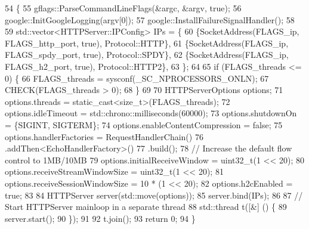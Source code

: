 \begin{DoxyCode}
54                                  \{
55   gflags::ParseCommandLineFlags(&argc, &argv, \textcolor{keyword}{true});
56   google::InitGoogleLogging(argv[0]);
57   google::InstallFailureSignalHandler();
58 
59   std::vector<HTTPServer::IPConfig> IPs = \{
60     \{SocketAddress(FLAGS\_ip, FLAGS\_http\_port, \textcolor{keyword}{true}), Protocol::HTTP\},
61     \{SocketAddress(FLAGS\_ip, FLAGS\_spdy\_port, \textcolor{keyword}{true}), Protocol::SPDY\},
62     \{SocketAddress(FLAGS\_ip, FLAGS\_h2\_port, \textcolor{keyword}{true}), Protocol::HTTP2\},
63   \};
64 
65   \textcolor{keywordflow}{if} (FLAGS\_threads <= 0) \{
66     FLAGS\_threads = sysconf(\_SC\_NPROCESSORS\_ONLN);
67     CHECK(FLAGS\_threads > 0);
68   \}
69 
70   HTTPServerOptions options;
71   options.threads = \textcolor{keyword}{static\_cast<}\textcolor{keywordtype}{size\_t}\textcolor{keyword}{>}(FLAGS\_threads);
72   options.idleTimeout = std::chrono::milliseconds(60000);
73   options.shutdownOn = \{SIGINT, SIGTERM\};
74   options.enableContentCompression = \textcolor{keyword}{false};
75   options.handlerFactories = RequestHandlerChain()
76       .addThen<EchoHandlerFactory>()
77       .build();
78   \textcolor{comment}{// Increase the default flow control to 1MB/10MB}
79   options.initialReceiveWindow = uint32\_t(1 << 20);
80   options.receiveStreamWindowSize = uint32\_t(1 << 20);
81   options.receiveSessionWindowSize = 10 * (1 << 20);
82   options.h2cEnabled = \textcolor{keyword}{true};
83 
84   HTTPServer server(std::move(options));
85   server.bind(IPs);
86 
87   \textcolor{comment}{// Start HTTPServer mainloop in a separate thread}
88   std::thread t([&] () \{
89     server.start();
90   \});
91 
92   t.join();
93   \textcolor{keywordflow}{return} 0;
94 \}
\end{DoxyCode}
